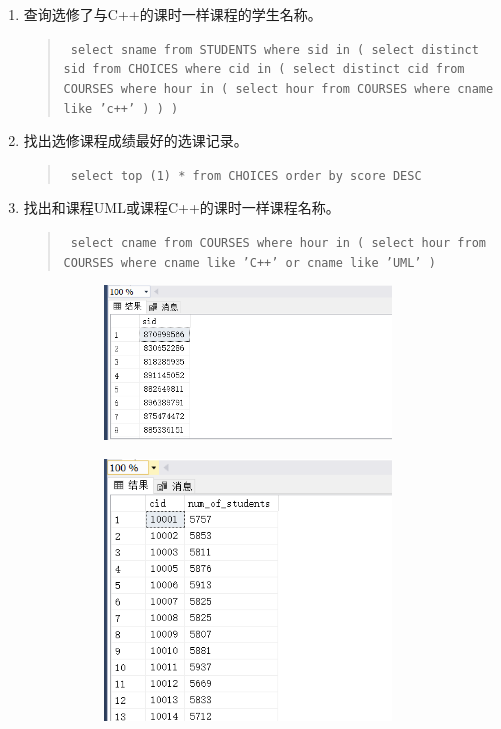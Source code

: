 \documentclass[a4paper,twoside]{article}
\begin{document}
\begin{spacing}{1.2}
\begin{enumerate}
\item 查询选修了与C++的课时一样课程的学生名称。
\begin{quote}
\texttt{
select sname from STUDENTS where
sid in (
select distinct sid from CHOICES where cid in (
select distinct cid from COURSES where hour in (
select hour from COURSES where cname like 'c++'
)
)
)
}
\end{quote}


\item 找出选修课程成绩最好的选课记录。
\begin{quote}
\texttt{
select top (1) * from CHOICES
order by score DESC
}
\end{quote}
\item 找出和课程UML或课程C++的课时一样课程名称。
\begin{quote}
\texttt{
select cname from COURSES where hour in (
select hour from COURSES where cname like 'C++' or cname like 'UML'
)
}
\end{quote}


\begin{figure}[h]
\centering
\caption{运行结果}
\begin{subfigure}{0.3\textwidth}
  \includegraphics[width=0.9\textwidth]{fig11.png}
\end{subfigure}
\begin{subfigure}{0.3\textwidth}
  \includegraphics[width=0.9\textwidth]{fig12.png}
\end{subfigure}
\end{figure}


\end{enumerate}
\end{spacing}
\end{document}
